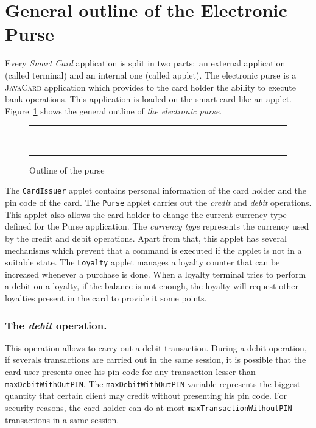 \documentclass[a4paper]{llncs}
\begin{document}
\section{General outline of the Electronic Purse}
\label{SectGenPurse}
Every \textit{Smart Card} application is split in two
parts$:$ an external application (called terminal) and an
internal one (called applet). The electronic purse is a
\textsc{JavaCard} application which provides to the card holder
the ability to execute bank operations. This application is loaded on
the smart card like an applet. Figure~\ref{fig-cas-pur} shows the
general outline of \textit{the electronic purse}.




\begin{center}
\begin{figure}[hbt]
\rule{\linewidth}{0.3mm}
\\[2.5ex]
\centering
\mbox{\epsfxsize=11cm}
\caption{Outline of the purse}
\label{fig-cas-pur}
\rule{\linewidth}{0.3mm}
\end{figure}
\end{center}




The  \texttt{CardIssuer} applet contains personal information of the card
holder and the pin code of the card. The \texttt{Purse}
applet carries out the \textit{credit} and \textit{debit}
operations. This applet also allows the card holder to change the
current currency type defined for the Purse application. The
\textit{currency type} represents the
currency used by the credit and debit operations. Apart from that,
this applet has several mechanisms
which prevent that a command is executed if the applet is not in a
suitable state. The \texttt{Loyalty} applet manages a loyalty counter
that can be increased whenever a purchase is done. When a loyalty
terminal tries to perform a debit on a loyalty, if the balance is not
enough, the loyalty will request other loyalties present in the card
to provide it some points.


\subsubsection{\bf The \textit{debit} operation.}
This operation allows to carry out a debit transaction. During a debit 
operation, if severals transactions are carried out in the same
session, it is possible that
the card user presents once his pin code for any transaction lesser than
\texttt{maxDebitWithOutPIN}. The \texttt{maxDebitWithOutPIN} variable
represents the biggest quantity that certain client may credit without
presenting his pin code. For
security reasons, the card holder can do at most
\texttt{maxTransactionWithoutPIN} transactions in a same session. 
\end{document}
